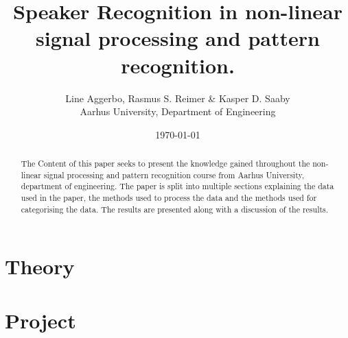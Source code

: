 

\title{
	\textbf{Speaker Recognition in non-linear signal processing and pattern recognition.
	}
}

\author{
	Line Aggerbo, Rasmus S. Reimer \& Kasper D. Saaby\\
	Aarhus University, Department of Engineering \\
}
\date{\today}




\maketitle


\begin{abstract}
The Content of this paper seeks to present the knowledge gained throughout the non-linear signal processing and pattern recognition course from Aarhus University, department of engineering. The paper is split into multiple sections explaining the data used in the paper, the methods used to process the data and the methods used for categorising the data. The results are presented along with a discussion of the results.
\end{abstract}


\chapter{Theory}


\chapter{Project}





